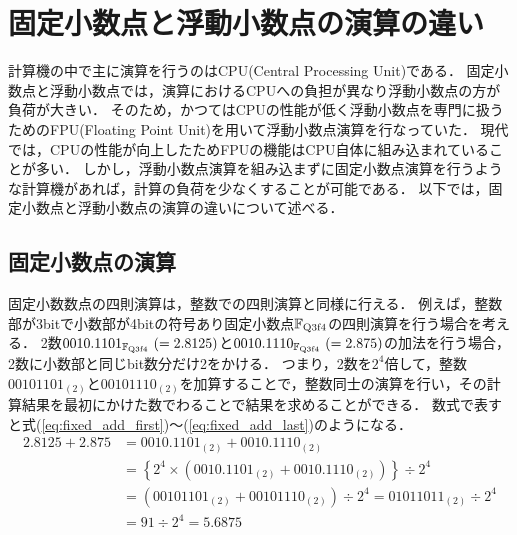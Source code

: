 \section{固定小数点と浮動小数点の演算の違い}
計算機の中で主に演算を行うのはCPU(Central Processing Unit)である．
固定小数点と浮動小数点では，演算におけるCPUへの負担が異なり浮動小数点の方が負荷が大きい．
そのため，かつてはCPUの性能が低く浮動小数点を専門に扱うためのFPU(Floating Point Unit)を用いて浮動小数点演算を行なっていた．
現代では，CPUの性能が向上したためFPUの機能はCPU自体に組み込まれていることが多い．
しかし，浮動小数点演算を組み込まずに固定小数点演算を行うような計算機があれば，計算の負荷を少なくすることが可能である．
以下では，固定小数点と浮動小数点の演算の違いについて述べる．

\subsection{固定小数点の演算}
固定小数数点の四則演算は，整数での四則演算と同様に行える．
例えば，整数部が3bitで小数部が4bitの符号あり固定小数点$\mathbb{F}_{\text{Q}{3}\text{f}{4}}$の四則演算を行う場合を考える．
2数$0010.1101_{\mathbb{F}_{\text{Q}{3}\text{f}{4}}} \ (= 2.8125)$と$0010.1110_{\mathbb{F}_{\text{Q}{3}\text{f}{4}}} \ (= 2.875)$の加法を行う場合，2数に小数部と同じbit数分だけ2をかける．
つまり，2数を$2^4$倍して，整数$00101101_{(2)}$と$00101110_{(2)}$を加算することで，整数同士の演算を行い，その計算結果を最初にかけた数でわることで結果を求めることができる．
数式で表すと式(\ref{eq:fixed_add_first})〜(\ref{eq:fixed_add_last})のようになる．
\begin{align}
    2.8125 + 2.875 &=
    0010.1101_{(2)} + 0010.1110_{(2)} \label{eq:fixed_add_first} \\
    &= \left\{ 2^4 \times \left(0010.1101_{(2)} + 0010.1110_{(2)}\right) \right\} \div 2^4 \\
    &= \left(00101101_{(2)} + 00101110_{(2)} \right) \div 2^4= 01011011_{(2)} \div 2^4\\
    &= 91 \div 2^4 = 5.6875 \label{eq:fixed_add_last}
\end{align}


